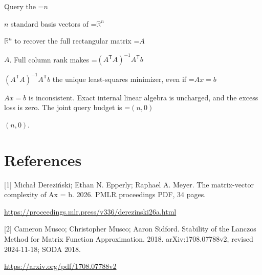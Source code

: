 \documentclass[10pt,a4paper]{article}
\newcommand{\AtlasMath}[1]{\par\begingroup\centering\setbox0=\hbox{$\displaystyle #1$}\ifdim\wd0>1.4\linewidth\typeout{ATLAS WIDE FORMULA: \the\wd0}\fi\ifdim\wd0>\linewidth\resizebox{\linewidth}{!}{\box0}\else\box0\fi\par\endgroup}
\newcommand{\AtlasInlineMath}[1]{\begingroup\setbox0=\hbox{$#1$}\ifdim\wd0>.4\linewidth\endgroup\AtlasMath{#1}\else\endgroup$#1$\fi}
\begin{document}
Query the \AtlasInlineMath{n} standard basis vectors of \AtlasInlineMath{\mathbb R^n} to recover the full rectangular matrix \AtlasInlineMath{A}. Full column rank makes \AtlasInlineMath{(A^{\mathsf T}A)^{-1}A^{\mathsf T}b} the unique least-squares minimizer, even if \AtlasInlineMath{Ax=b} is inconsistent. Exact internal linear algebra is uncharged, and the excess loss is zero. The joint query budget is \AtlasInlineMath{(n,0)}.

\section{References}
[1] Michał Dereziński; Ethan N. Epperly; Raphael A. Meyer. The matrix-vector complexity of Ax = b. 2026. PMLR proceedings PDF, 34 pages.

\url{https://proceedings.mlr.press/v336/derezinski26a.html}

[2] Cameron Musco; Christopher Musco; Aaron Sidford. Stability of the Lanczos Method for Matrix Function Approximation. 2018. arXiv:1708.07788v2, revised 2024-11-18; SODA 2018.

\url{https://arxiv.org/pdf/1708.07788v2}
\end{document}
